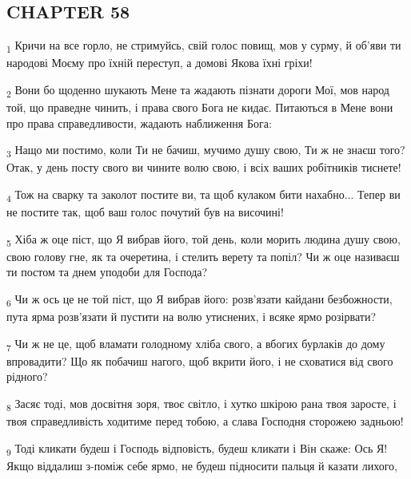 \subsection{CHAPTER 58}
\begin{tcolorbox}
\textsubscript{1} Кричи на все горло, не стримуйсь, свій голос повищ, мов у сурму, й об'яви ти народові Моєму про їхній переступ, а домові Якова їхні гріхи!
\end{tcolorbox}
\begin{tcolorbox}
\textsubscript{2} Вони бо щоденно шукають Мене та жадають пізнати дороги Мої, мов народ той, що праведне чинить, і права свого Бога не кидає. Питаються в Мене вони про права справедливости, жадають наближення Бога:
\end{tcolorbox}
\begin{tcolorbox}
\textsubscript{3} Нащо ми постимо, коли Ти не бачиш, мучимо душу свою, Ти ж не знаєш того? Отак, у день посту свого ви чините волю свою, і всіх ваших робітників тиснете!
\end{tcolorbox}
\begin{tcolorbox}
\textsubscript{4} Тож на сварку та заколот постите ви, та щоб кулаком бити нахабно... Тепер ви не постите так, щоб ваш голос почутий був на височині!
\end{tcolorbox}
\begin{tcolorbox}
\textsubscript{5} Хіба ж оце піст, що Я вибрав його, той день, коли морить людина душу свою, свою голову гне, як та очеретина, і стелить верету та попіл? Чи ж оце називаєш ти постом та днем уподоби для Господа?
\end{tcolorbox}
\begin{tcolorbox}
\textsubscript{6} Чи ж ось це не той піст, що Я вибрав його: розв'язати кайдани безбожности, пута ярма розв'язати й пустити на волю утиснених, і всяке ярмо розірвати?
\end{tcolorbox}
\begin{tcolorbox}
\textsubscript{7} Чи ж не це, щоб вламати голодному хліба свого, а вбогих бурлаків до дому впровадити? Що як побачиш нагого, щоб вкрити його, і не сховатися від свого рідного?
\end{tcolorbox}
\begin{tcolorbox}
\textsubscript{8} Засяє тоді, мов досвітня зоря, твоє світло, і хутко шкірою рана твоя заросте, і твоя справедливість ходитиме перед тобою, а слава Господня сторожею задньою!
\end{tcolorbox}
\begin{tcolorbox}
\textsubscript{9} Тоді кликати будеш і Господь відповість, будеш кликати і Він скаже: Ось Я! Якщо віддалиш з-поміж себе ярмо, не будеш підносити пальця й казати лихого,
\end{tcolorbox}
